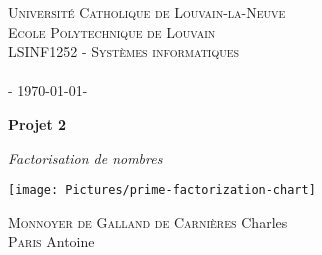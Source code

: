 \begin{titlepage}

\begin{center}
\textsc{\LARGE  Université Catholique de Louvain-la-Neuve}\\[0.5cm]

\textsc{\large Ecole Polytechnique de Louvain\\ 
LSINF1252 - Systèmes informatiques}\\[1cm]

\textsc{\Large   \\  \vspace{0.8cm}- \today -}\\[0.5cm]

\vspace{0.5cm}

{ \huge \bfseries Projet 2 \\
 [0.4cm]}
 
{\Large \textit{Factorisation de nombres}}

\vspace{1.5cm}

\texttt{[image: Pictures/prime-factorization-chart]}
 
\vspace{1.5cm}
 
\textsc {Monnoyer de Galland de Carnières} Charles\\
\textsc {Paris} Antoine

\end{center}
\end{titlepage}